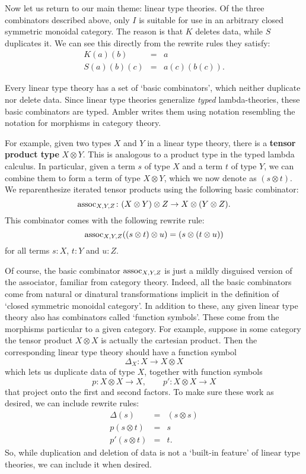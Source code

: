 \documentclass[12pt]{article}
\newcommand{\maps}{\colon}
\newcommand{\tensor}{\otimes}
\newcommand{\assoc}{{\rm assoc}}
\begin{document}
Now let us return to our main theme: linear type theories.  Of the
three combinators described above, only $I$ is suitable for use in an
arbitrary closed symmetric monoidal category.  The reason is that $K$
deletes data, while $S$ duplicates it.  We can see this directly from
the rewrite rules they satisfy:
\[
\begin{array}{ccl}
 K(a)(b) &=& a   \\
 S(a)(b)(c) &=& a(c)(b(c)).
\end{array}
\]

Every linear type theory has a set of `basic combinators', which
neither duplicate nor delete data.  Since linear type theories
generalize {\it typed} lambda-theories, these basic combinators are
typed.  Ambler writes them using notation resembling the
notation for morphisms in category theory.   

For example, given two types $X$ and $Y$ in a
linear type theory, there is a {\bf tensor product type} $X \otimes
Y$.  This is analogous to a product type in the typed lambda calculus.
In particular, given a term $s$ of type $X$ and a term $t$ of type
$Y$, we can combine them to form a term of type $X \tensor Y$, which
we now denote as $(s \tensor t)$.  We reparenthesize iterated
tensor products using the following basic combinator:
\[   \assoc_{X,Y,Z}
      \maps (X\tensor Y)\tensor Z \to X \tensor (Y \tensor Z). \]
This combinator comes with the following rewrite rule:
\[   \assoc_{X,Y,Z}((s \tensor t) \tensor u) = (s \tensor (t \tensor u)) \]
for all terms $s:X$, $t:Y$ and $u:Z$.  

Of course, the basic combinator $\assoc_{X,Y,Z}$ is just a mildly
disguised version of the associator, familiar from category theory.
Indeed, all the basic combinators come from natural or dinatural
transformations implicit in the definition of `closed symmetric
monoidal category'.  In addition to these, any given
linear type theory also has combinators called `function symbols'.
These come from the morphisms particular to a given category.
For example, suppose in some category the tensor product $X \otimes X$
is actually the cartesian product.  Then the corresponding linear type
theory should have a function symbol
\[        \Delta_X \maps X \to X \tensor X \]
which lets us duplicate data of type $X$, together with function symbols
\[         p \maps X \tensor X \to X, \qquad p' \maps X \tensor X \to X \]
that project onto the first and second factors.  To make sure
these work as desired, we can include rewrite rules:
\[ 
\begin{array}{ccc}
      \Delta(s) &=& (s \otimes s)  \\
      p(s \otimes t) &=& s \\
      p'(s \otimes t) &=& t  .
\end{array}
\]
So, while duplication and deletion of data is not a `built-in feature'
of linear type theories, we can include it when desired.  
\end{document}
